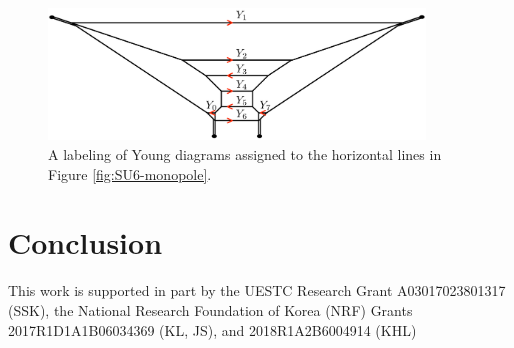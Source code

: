 \documentclass[letterpaper, 11pt]{article}
\begin{document}
\begin{figure}[t]
\centering
\includegraphics[width=10cm]{SU6young.pdf}
\caption{A labeling of Young diagrams assigned to the horizontal lines in Figure \ref{fig:SU6-monopole}.}
\label{fig:SU6young}
\end{figure}



\section{Conclusion} \label{sec:conclusion}


\acknowledgments
This work is supported in part by the UESTC Research Grant A03017023801317 (SSK), the National Research Foundation of Korea (NRF) Grants 2017R1D1A1B06034369 (KL, JS), and 2018R1A2B6004914 (KHL)




\end{document}
